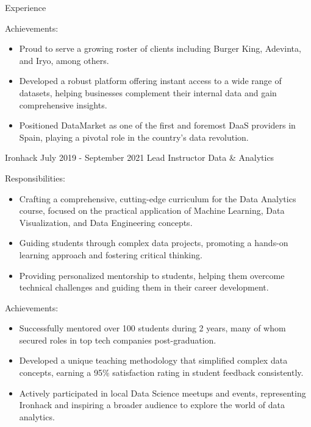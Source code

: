 \documentclass{cv}
\begin{document}
\begin{rSection}{Experience}
\begin{rSubsection}
			\vspace{2mm}
			
			\item Achievements:
			\begin{itemize}
				\item Proud to serve a growing roster of clients including Burger King, Adevinta, and Iryo, among others.
				\item Developed a robust platform offering instant access to a wide range of datasets, helping businesses complement their internal data and gain comprehensive insights.
				\item Positioned DataMarket as one of the first and foremost DaaS providers in Spain, playing a pivotal role in the country's data revolution.
			\end{itemize}
			
		\end{rSubsection}
		
		
			\begin{rSubsection}
			{Ironhack}
			{July 2019 - September 2021}
			{Lead Instructor Data \& Analytics}
			
			\item Responsibilities:
			\begin{itemize}
				\item Crafting a comprehensive, cutting-edge curriculum for the Data Analytics course, focused on the practical application of Machine Learning, Data Visualization, and Data Engineering concepts.
				\item Guiding students through complex data projects, promoting a hands-on learning approach and fostering critical thinking.
				\item Providing personalized mentorship to students, helping them overcome technical challenges and guiding them in their career development.
			\end{itemize}
			
			\vspace{2mm}
			
			\item Achievements:
			\begin{itemize}
				\item Successfully mentored over 100 students during 2 years, many of whom secured roles in top tech companies post-graduation.
				\item Developed a unique teaching methodology that simplified complex data concepts, earning a 95\% satisfaction rating in student feedback consistently.
				\item Actively participated in local Data Science meetups and events, representing Ironhack and inspiring a broader audience to explore the world of data analytics.
			\end{itemize}
			

\end{rSubsection}
\end{rSection}
\end{document}
